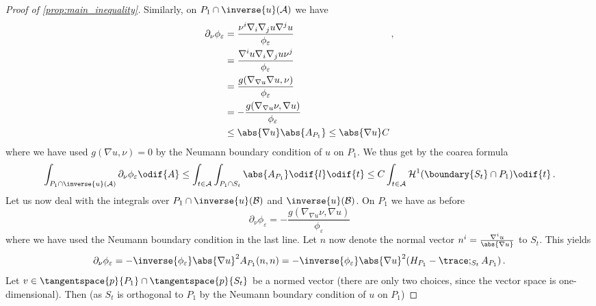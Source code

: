 \documentclass[titlepage,numbers=noenddot,oneside,%
cleardoublepage=empty,paper=a4,fontsize=11pt,%
english,%
]{scrartcl}
\newcommand*{\mathcomma}{\,,}
\newcommand*{\mathfullstop}{\,.}
\begin{document}
{\begin{proof}[Proof of \cref{prop:main_inequality}]
            Similarly, on \( P_1\cap \inverse{u}(\mathcal{A}) \) we have 
            \begin{equation*}
                \begin{aligned}[t]
                    \partial_{\nu}\phi_\varepsilon & =\frac{\nu^i\nabla_i\nabla_j u \nabla^j u}{\phi_\varepsilon}   \\ 
                                                   & =\frac{\nabla^i u \nabla_i \nabla_j u \nu^j}{\phi_\varepsilon} \\
                                                   & =\frac{g(\nabla_{\nabla u}\nabla u,\nu)}{\phi_\varepsilon}     \\
                                                   & =-\frac{g(\nabla_{\nabla u}\nu,\nabla u)}{\phi_\varepsilon}    \\
                                                   & \leq \abs{\nabla u}\abs{A_{P_1}}\leq \abs{\nabla u}C
                \end{aligned}\mathcomma
            \end{equation*}
            where we have used \( g(\nabla u,\nu)=0 \) by the Neumann boundary condition of \( u \) on \( P_1 \). We thus get by the coarea formula
            \begin{equation}
                \int_{P_1\cap \inverse{u}(\mathcal{A})}\partial_{\nu} \phi_\varepsilon\odif{A}\leq \int_{t\in \mathcal{A}}\int_{P_1\cap S_t}\abs{A_{P_1}}\odif{l}\odif{t}\leq C\int_{t\in \mathcal{A}}\mathcal{H}^1(\boundary{S_t}\cap P_1)\odif{t}\mathfullstop\label{eq:A_boundary_bounded}
            \end{equation}
            Let us now deal with the integrals over \( P_1\cap \inverse{u}(\mathcal{B}) \) and \( \inverse{u}(\mathcal{B}) \). On \( P_1 \) we have as before
            \begin{equation*}
                \partial_\nu \phi_\varepsilon=-\frac{g(\nabla_{\nabla u}\nu,\nabla u)}{\phi_\varepsilon}
            \end{equation*}
            where we have used the Neumann boundary condition in the last line. Let \( n \) now denote the normal vector \( n^i=\frac{\nabla^i u}{\abs{\nabla u}} \) to \( S_t \). This yields
            \begin{equation*}
                \partial_\nu\phi_\varepsilon=-\inverse{\phi_\varepsilon}\abs{\nabla u}^2A_{P_1}(n,n)=-\inverse{\phi_\varepsilon}\abs{\nabla u}^2(H_{P_1}-\trace;_{S_t}A_{P_1})\mathfullstop
            \end{equation*}
            Let \( v\in \tangentspace{p}{P_1}\cap\tangentspace{p}{S_t} \) be a normed vector (there are only two choices, since the vector space is one-dimensional). Then (as \( S_t \) is orthogonal to \( P_1 \) by the Neumann boundary condition of \( u \) on \( P_1 \))

\end{proof}}
\end{document}
